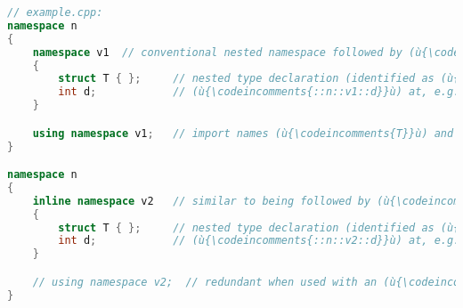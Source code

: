 \begin{lstlisting}[language=C++]
// example.cpp:
namespace n
{
    namespace v1  // conventional nested namespace followed by (ù{\codeincomments{using}}ù) directive
    {
        struct T { };     // nested type declaration (identified as (ù{\codeincomments{::n::v1::T}}ù))
        int d;            // (ù{\codeincomments{::n::v1::d}}ù) at, e.g., (ù{\codeincomments{0x01a64e90}}ù)
    }

    using namespace v1;   // import names (ù{\codeincomments{T}}ù) and (ù{\codeincomments{d}}ù) into (ù{\codeincomments{namespace n}}ù)
}

namespace n
{
    inline namespace v2   // similar to being followed by (ù{\codeincomments{using namespace v2}}ù)
    {
        struct T { };     // nested type declaration (identified as (ù{\codeincomments{::n::v2::T}}ù))
        int d;            // (ù{\codeincomments{::n::v2::d}}ù) at, e.g., (ù{\codeincomments{0x01a64e94}}ù)
    }

    // using namespace v2;  // redundant when used with an (ù{\codeincomments{inline namespace}}ù)
}
\end{lstlisting}

